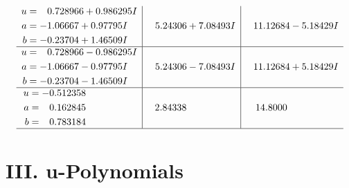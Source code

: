 \documentclass[1p]{elsarticle_modified}
\theoremstyle{definition}
\begin{document}
$$\begin{array}{c|c|c}
\begin{aligned}
u &= \phantom{-}0.728966 + 0.986295 I \\
a &= -1.06667 + 0.97795 I \\
b &= -0.23704 + 1.46509 I\end{aligned}
 & \phantom{-}5.24306 + 7.08493 I & \phantom{-}11.12684 - 5.18429 I \\ \hline\begin{aligned}
u &= \phantom{-}0.728966 - 0.986295 I \\
a &= -1.06667 - 0.97795 I \\
b &= -0.23704 - 1.46509 I\end{aligned}
 & \phantom{-}5.24306 - 7.08493 I & \phantom{-}11.12684 + 5.18429 I \\ \hline\begin{aligned}
u &= -0.512358\phantom{ +0.000000I} \\
a &= \phantom{-}0.162845\phantom{ +0.000000I} \\
b &= \phantom{-}0.783184\phantom{ +0.000000I}\end{aligned}
 & \phantom{-}2.84338\phantom{ +0.000000I} & \phantom{-}14.8000\phantom{ +0.000000I}\\
 \hline 
 \end{array}$$\newpage
\newpage\renewcommand{\arraystretch}{1}
\centering \section*{ III. u-Polynomials}
\end{document}
